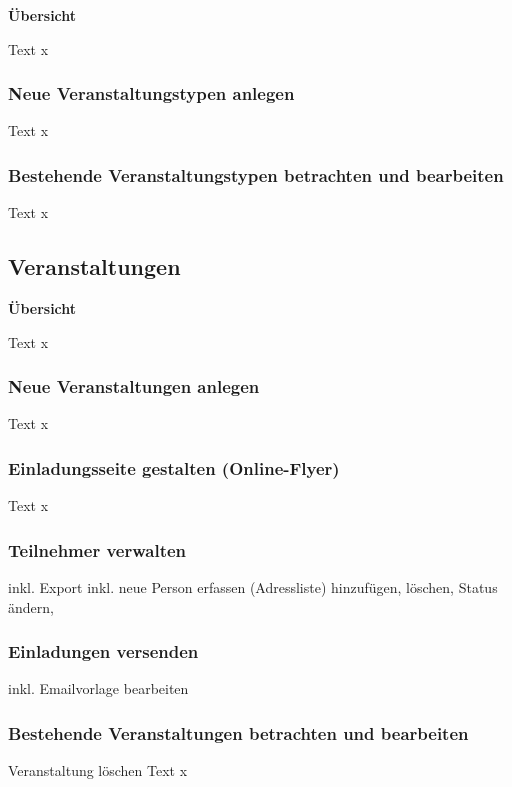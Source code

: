 \textbf{Übersicht}

Text x

\subsubsection{Neue Veranstaltungstypen anlegen}

Text x

\subsubsection{Bestehende Veranstaltungstypen betrachten und bearbeiten}

Text x

\vspace{\baselineskip}

\subsection{Veranstaltungen}

\textbf{Übersicht}

Text x

\subsubsection{Neue Veranstaltungen anlegen}

Text x

\subsubsection{Einladungsseite gestalten (Online-Flyer)}

Text x

\subsubsection{Teilnehmer verwalten}

inkl. Export
inkl. neue Person erfassen (Adressliste)
hinzufügen, löschen, Status ändern, 


\subsubsection{Einladungen versenden}

inkl. Emailvorlage bearbeiten

\subsubsection{Bestehende Veranstaltungen betrachten und bearbeiten}

Veranstaltung löschen
Text x

